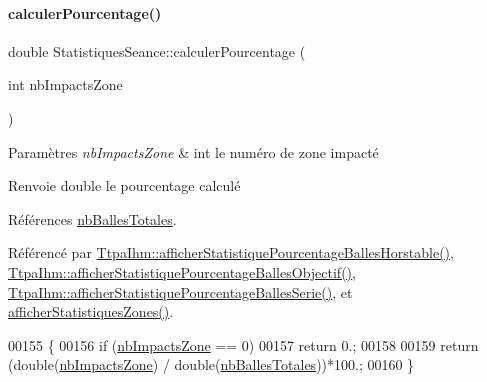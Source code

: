 \mbox{\label{class_statistiques_seance_a67759edd6c296bd6b66f7860dbac130e}} 
\paragraph{\texorpdfstring{calculer\+Pourcentage()}{calculerPourcentage()}}
{\footnotesize\ttfamily double Statistiques\+Seance\+::calculer\+Pourcentage (\begin{DoxyParamCaption}\item[{int}]{nb\+Impacts\+Zone }\end{DoxyParamCaption})}


\begin{DoxyParams}{Paramètres}
{\em nb\+Impacts\+Zone} & int le numéro de zone impacté \\
\hline
\end{DoxyParams}
\begin{DoxyReturn}{Renvoie}
double le pourcentage calculé 
\end{DoxyReturn}


Références \hyperlink{class_statistiques_seance_a27eb3965bbe304700d3254534c5e4ed3}{nb\+Balles\+Totales}.



Référencé par \hyperlink{class_ttpa_ihm_a58058063eb377b4c4c48048e4bf84e77}{Ttpa\+Ihm\+::afficher\+Statistique\+Pourcentage\+Balles\+Horstable()}, \hyperlink{class_ttpa_ihm_ac37d57d13301cda22f062219de8731c4}{Ttpa\+Ihm\+::afficher\+Statistique\+Pourcentage\+Balles\+Objectif()}, \hyperlink{class_ttpa_ihm_aec988dc2398578eb8e91563d1ba58cde}{Ttpa\+Ihm\+::afficher\+Statistique\+Pourcentage\+Balles\+Serie()}, et \hyperlink{class_statistiques_seance_afd9087c34222c0b2c0db11c5a96459c4}{afficher\+Statistiques\+Zones()}.


\begin{DoxyCode}
00155 \{
00156     \textcolor{keywordflow}{if} (\hyperlink{class_statistiques_seance_aa4a040cda282d5b1c250025f8e191e20}{nbImpactsZone} == 0)
00157         \textcolor{keywordflow}{return} 0.;
00158 
00159     \textcolor{keywordflow}{return} (\textcolor{keywordtype}{double}(\hyperlink{class_statistiques_seance_aa4a040cda282d5b1c250025f8e191e20}{nbImpactsZone}) / \textcolor{keywordtype}{double}(\hyperlink{class_statistiques_seance_a27eb3965bbe304700d3254534c5e4ed3}{nbBallesTotales}))*100.;
00160 \}
\end{DoxyCode}
\mbox{\label{class_statistiques_seance_ad042b683ce7b4db507a443b1b27bfef8}} 
